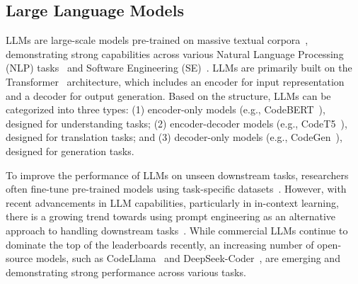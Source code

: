 \subsection{Large Language Models}

LLMs are large-scale models pre-trained on massive textual corpora~\cite{ouyang_training_2022, raffel_exploring_2020, vaswani_attention_2017}, demonstrating strong capabilities across various Natural Language Processing (NLP) tasks~\cite{zhao_survey_2024} and Software Engineering (SE)~\cite{zhang2023survey_se,wang_software_2024}. 
LLMs are primarily built on the Transformer~\cite{vaswani_attention_2017} architecture, which includes an encoder for input representation and a decoder for output generation.
Based on the structure, LLMs can be categorized into three types: (1) encoder-only models (e.g., CodeBERT~\cite{feng_codebert_2020}), designed for understanding tasks; (2) encoder-decoder models (e.g., CodeT5~\cite{wang_codet5_2021}), designed for translation tasks; and (3) decoder-only models (e.g., CodeGen~\cite{nijkamp_codegen_2023}), designed for generation tasks.

To improve the performance of LLMs on unseen downstream tasks, researchers often fine-tune pre-trained models using task-specific datasets~\cite{zhang2023pre,yuan2022circle}.
However, with recent advancements in LLM capabilities, particularly in in-context learning, there is a growing trend towards using prompt engineering as an alternative approach to handling downstream tasks~\cite{wang_software_2024}.
While commercial LLMs continue to dominate the top of the leaderboards recently, an increasing number of open-source models, such as CodeLlama~\cite{roziere_code_2024} and DeepSeek-Coder~\cite{guo_deepseek-coder_2024}, are emerging and demonstrating strong performance across various tasks.
